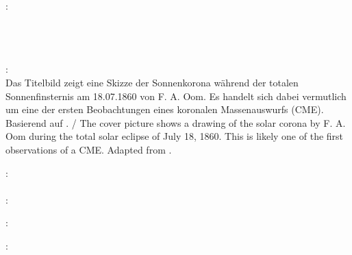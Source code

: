 \thispagestyle{empty}

\hfill

\vfill

\noindent\myName:\\
\textit{\myTitle \\ \mySubtitle} \\%
\textcopyright\ \myTime

\vspace{1cm}

\noindent{}: \\
{\footnotesize Das Titelbild zeigt eine Skizze der Sonnenkorona während der totalen Sonnenfinsternis am 18.07.1860 von F. A. Oom. Es handelt sich dabei vermutlich um eine der ersten Beobachtungen eines koronalen Massenauswurfs (\acs{CME}). Basierend auf \citet[S. 551]{Ranyard-1879}.  /
    The cover picture shows a drawing of the solar corona by F. A. Oom during the total solar eclipse of July 18, 1860. This is likely one of the first observations of a \ac{CME}. Adapted from \citet[page 551]{Ranyard-1879}.}\\

\vspace{1cm}

\noindent{}: \\
\myProf \\

\noindent{}: \\



\vspace{1cm}

\noindent{}: \\

\bigskip

\noindent{}: \\

\vspace{1cm}

